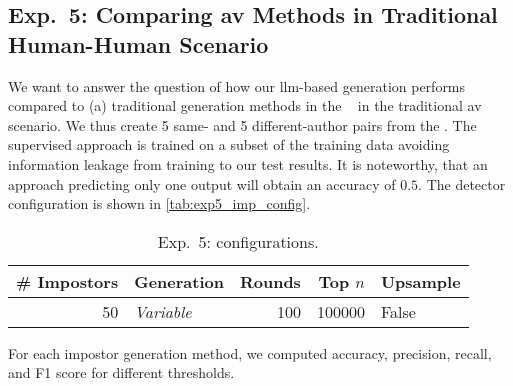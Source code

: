 \subsection{Exp.\ 5: Comparing \acs{av} Methods in Traditional Human-Human Scenario}
\label{subsec:imp_gen}

We want to answer the question of how our \ac{llm}-based \imp{} generation performs compared to (a) traditional \imp{} generation methods in the \impAppr{}~\citep{koppel_determining_2014} %
in the traditional \ac{av} scenario.
We thus create {5 same- and 5 different-author pairs} from the \dataStudent{}. %
The supervised approach is trained on a subset of the training data avoiding information leakage from training to our test results.
It is noteworthy, that an approach predicting only one output will obtain an accuracy of $0.5$.
The \impAppr{} 
detector configuration is shown in \autoref{tab:exp5_imp_config}. %

\begin{table}[h]
\centering\small
\caption{Exp.\ 5: \impAppr{} configurations.}
\label{tab:exp5_imp_config}
\begin{tabular}{@{}rlrrl@{}}   %
\toprule
\# Impostors & Generation & Rounds & Top $n$ & Upsample \\
\midrule
50 & \textit{Variable} & 100 & \num{100000} & False \\
\bottomrule
\end{tabular}%
\end{table}


For each impostor generation method, we computed accuracy, precision, recall, and F1 score for different thresholds. 
